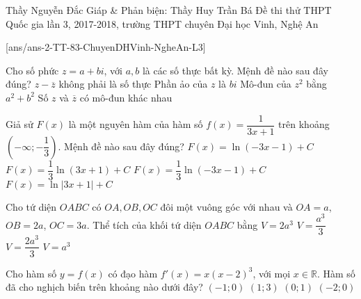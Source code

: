 	\begin{name}
		{Thầy Nguyễn Đắc Giáp  \& Phản biện: Thầy Huy Trần Bá}
		{Đề thi thử THPT Quốc gia lần 3, 2017-2018, trường THPT chuyên Đại học Vinh, Nghệ An}
	\end{name}
	\setcounter{ex}{0}
	[ans/ans-2-TT-83-ChuyenDHVinh-NgheAn-L3]
\begin{ex}%
	Cho số phức $z=a+bi$, với $a,b$ là các số thực bất kỳ. Mệnh đề nào sau đây đúng?
	\choice
	{$z-\overline{z}$ không phải là số thực}
	{Phần ảo của $z$ là $bi$}
	{\True Mô-đun của $z^2$ bằng $a^2+b^2$}
	{Số $z$ và $\overline{z}$ có mô-đun khác nhau}
\end{ex}
\begin{ex}%
	Giả sử $F(x)$ là một nguyên hàm của hàm số $f(x)=\dfrac{1}{3x+1}$ trên khoảng $\left(-\infty;-\dfrac{1}{3}\right)$. Mệnh đề nào sau đây đúng?
	\choice
	{$F(x)=\ln (-3x-1)+C$}
	{$F(x)=\dfrac{1}{3}\ln (3x+1)+C$}
	{\True $F(x)=\dfrac{1}{3}\ln (-3x-1)+C$}
	{$F(x)=\ln \left|3x+1\right|+C$}
\end{ex}
\begin{ex}%
	Cho tứ diện $OABC$ có $OA,OB,OC$ đôi một vuông góc với nhau và $OA=a$, $OB=2a$, $OC=3a$. Thể tích của khối tứ diện $OABC$ bằng
	\choice
	{$V=2a^3$}
	{$V=\dfrac{a^3}{3}$}
	{$V=\dfrac{2a^3}{3}$}
	{\True $V=a^3$}
\end{ex}
\begin{ex}%
	Cho hàm số $y=f(x)$ có đạo hàm $f'(x)=x(x-2)^3$, với mọi $x\in \mathbb{R}$. Hàm số đã cho nghịch biến trên khoảng nào dưới đây?
	\choice
	{$(-1;0)$}
	{$(1;3)$}
	{\True $(0;1)$}
	{$(-2;0)$}
\end{ex}
